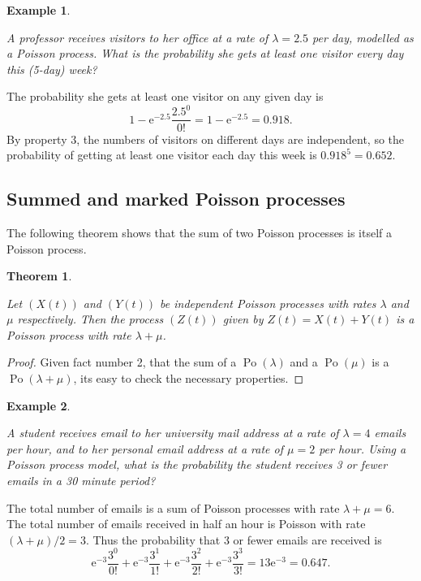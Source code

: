 \documentclass[
  a4paper,
]{article}
\newtheorem{theorem}{Theorem}[section]
\theoremstyle{definition}
\theoremstyle{definition}
\newtheorem{example}{Example}[section]
\theoremstyle{definition}
\theoremstyle{remark}
\begin{document}
\begin{example}
\protect\hypertarget{exm:poisson-ex-2}{}\label{exm:poisson-ex-2}

\emph{A professor receives visitors to her office at a rate of \(\lambda = 2.5\) per day, modelled as a Poisson process. What is the probability she gets at least one visitor every day this (5-day) week?}

The probability she gets at least one visitor on any given day is
\[ 1 - \mathrm{e}^{-2.5} \frac{2.5^0}{0!} = 1 - \mathrm{e}^{-2.5} = 0.918.   \]
By property 3, the numbers of visitors on different days are independent, so the probability of getting at least one visitor each day this week is
\(0.918^5 = 0.652\).

\end{example}

\hypertarget{summed-marked}{%
\subsection{Summed and marked Poisson processes}\label{summed-marked}}

The following theorem shows that the sum of two Poisson processes is itself a Poisson process.

\begin{theorem}
\protect\hypertarget{thm:summed}{}\label{thm:summed}

Let \((X(t))\) and \((Y(t))\) be independent Poisson processes with rates \(\lambda\) and \(\mu\) respectively. Then the process \((Z(t))\) given by \(Z(t) = X(t) + Y(t)\) is a Poisson process with rate \(\lambda+\mu\).

\end{theorem}

\begin{proof}

Given fact number 2, that the sum of a \(\operatorname{Po}(\lambda)\) and a \(\operatorname{Po}(\mu)\) is a \(\operatorname{Po}(\lambda+\mu)\), its easy to check the necessary properties.

\end{proof}

\begin{example}
\protect\hypertarget{exm:poisson-ex-3}{}\label{exm:poisson-ex-3}

\emph{A student receives email to her university mail address at a rate of \(\lambda = 4\) emails per hour, and to her personal email address at a rate of \(\mu = 2\) per hour. Using a Poisson process model, what is the probability the student receives 3 or fewer emails in a 30 minute period?}

The total number of emails is a sum of Poisson processes with rate \(\lambda + \mu = 6\). The total number of emails received in half an hour is Poisson with rate \((\lambda + \mu)/2 = 3\). Thus the probability that 3 or fewer emails are received is
\[ \mathrm{e}^{-3} \frac{3^0}{0!} + \mathrm{e}^{-3} \frac{3^1}{1!} + \mathrm{e}^{-3} \frac{3^2}{2!} + \mathrm{e}^{-3} \frac{3^3}{3!} = 13\mathrm{e}^{-3} = 0.647 . \]

\end{example}
\end{document}
